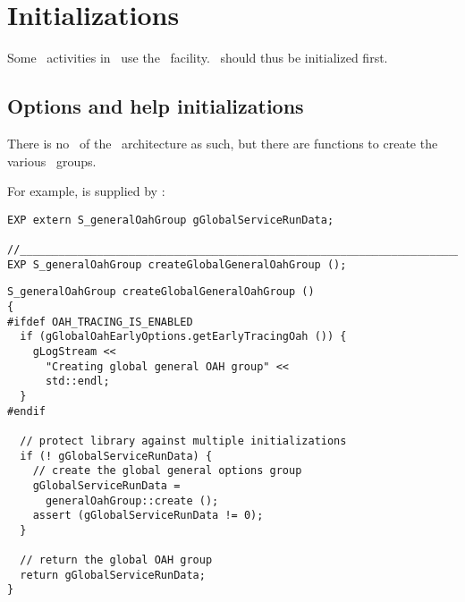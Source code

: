 
\chapter{Initializations}

Some \initialization\ activities in \mf\ use the \oahRepr\ facility. \oahRepr\ should thus be initialized first.


\section{Options and help initializations}

There is no \initialization\  of the \oahRepr\ architecture as such, but there are  functions to create the various \oahRepr\ groups.

For example,  is supplied by : %
\begin{lstlisting}[language=CPlusPlus]
EXP extern S_generalOahGroup gGlobalServiceRunData;

//______________________________________________________________________________
EXP S_generalOahGroup createGlobalGeneralOahGroup ();
\end{lstlisting}

\begin{lstlisting}[language=CPlusPlus]
S_generalOahGroup createGlobalGeneralOahGroup ()
{
#ifdef OAH_TRACING_IS_ENABLED
  if (gGlobalOahEarlyOptions.getEarlyTracingOah ()) {
    gLogStream <<
      "Creating global general OAH group" <<
      std::endl;
  }
#endif

  // protect library against multiple initializations
  if (! gGlobalServiceRunData) {
    // create the global general options group
    gGlobalServiceRunData =
      generalOahGroup::create ();
    assert (gGlobalServiceRunData != 0);
  }

  // return the global OAH group
  return gGlobalServiceRunData;
}
\end{lstlisting}


